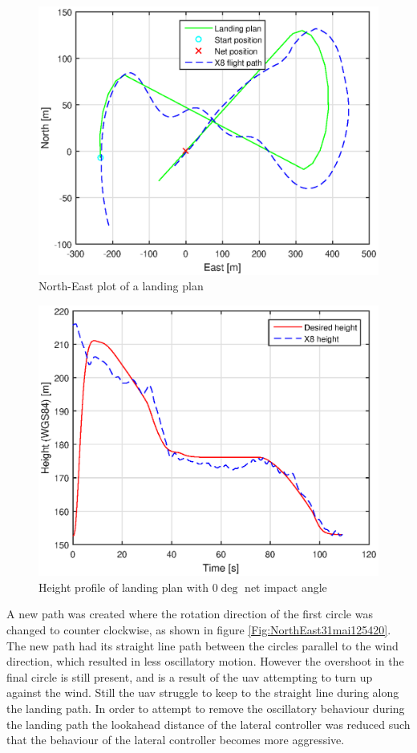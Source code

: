 \begin{figure}[H]
	\centering
		\includegraphics[scale=0.7]{figs/Experiment/NorthEast31mai105034.eps}
		\caption{North-East plot of a landing plan}
		\label{Fig:NorthEast31mai105034}
\end{figure}
\begin{figure}[H]
\centering
		\includegraphics[scale=0.7]{figs/Experiment/Height31mai105034.eps}
		\caption{Height profile of landing plan with $0 \deg$ net impact angle}
		\label{Fig:Height31mai31mai105034}
\end{figure}
A new path was created where the rotation direction of the first circle was changed to counter clockwise, as shown in figure \ref{Fig:NorthEast31mai125420}. The new path had its straight line path between the circles parallel to the wind direction, which resulted in less oscillatory motion. However the overshoot in the final circle is still present, and is a result of the \gls{uav} attempting to turn up against the wind. Still the \gls{uav} struggle to keep to the straight line during along the landing path. In order to attempt to remove the oscillatory behaviour during the landing path the lookahead distance of the lateral controller was reduced such that the behaviour of the lateral controller becomes more aggressive. 
